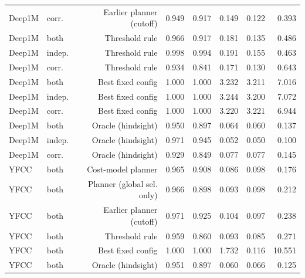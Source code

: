 \begin{table}[t]
\begin{tabular}{llrrrrrr}
Deep1M & corr. & Earlier planner (cutoff) & 0.949 & 0.917 & 0.149 & 0.122 & 0.393 \\
Deep1M & both & Threshold rule & 0.966 & 0.917 & 0.181 & 0.135 & 0.486 \\
Deep1M & indep. & Threshold rule & 0.998 & 0.994 & 0.191 & 0.155 & 0.463 \\
Deep1M & corr. & Threshold rule & 0.934 & 0.841 & 0.171 & 0.130 & 0.643 \\
Deep1M & both & Best fixed config & 1.000 & 1.000 & 3.232 & 3.211 & 7.016 \\
Deep1M & indep. & Best fixed config & 1.000 & 1.000 & 3.244 & 3.200 & 7.072 \\
Deep1M & corr. & Best fixed config & 1.000 & 1.000 & 3.220 & 3.221 & 6.944 \\
Deep1M & both & Oracle (hindsight) & 0.950 & 0.897 & 0.064 & 0.060 & 0.137 \\
Deep1M & indep. & Oracle (hindsight) & 0.971 & 0.945 & 0.052 & 0.050 & 0.100 \\
Deep1M & corr. & Oracle (hindsight) & 0.929 & 0.849 & 0.077 & 0.077 & 0.145 \\
YFCC & both & Cost-model planner & 0.965 & 0.908 & 0.086 & 0.098 & 0.176 \\
YFCC & both & Planner (global sel. only) & 0.966 & 0.898 & 0.093 & 0.098 & 0.212 \\
YFCC & both & Earlier planner (cutoff) & 0.971 & 0.925 & 0.104 & 0.097 & 0.238 \\
YFCC & both & Threshold rule & 0.959 & 0.860 & 0.093 & 0.085 & 0.271 \\
YFCC & both & Best fixed config & 1.000 & 1.000 & 1.732 & 0.116 & 10.551 \\
YFCC & both & Oracle (hindsight) & 0.951 & 0.897 & 0.060 & 0.066 & 0.125 \\
\bottomrule
\end{tabular}
\end{table}

